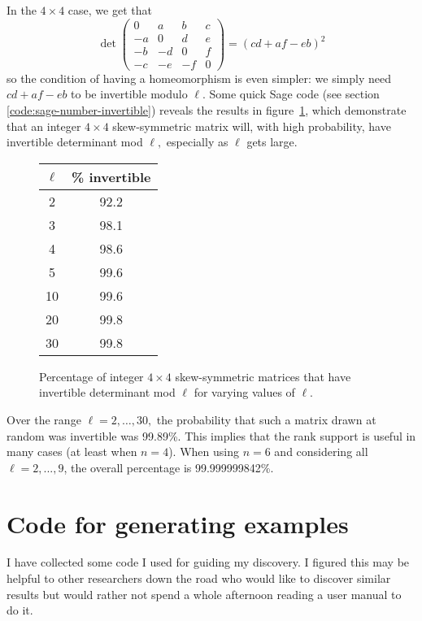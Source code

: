 \documentclass [11pt, proquest] {uwthesis}[2020/02/24]
\begin{document}
{    In the $4\times 4$ case, we get that
    \[\det\begin{pmatrix}
        0 & a & b & c\\
        -a & 0 & d & e\\
        -b & -d & 0 & f\\
        -c & -e & -f & 0
    \end{pmatrix}=(cd+af-eb)^2\]
    so the condition of having a homeomorphism is even simpler: we simply need $cd+af-eb$ to be invertible modulo $\ell.$ Some quick Sage code (see section \ref{code:sage-number-invertible}) reveals the results in figure~\ref{fig:invertible-table}, which demonstrate that an integer $4\times 4$ skew-symmetric matrix will, with high probability, have invertible determinant mod $\ell,$ especially as $\ell$ gets large. 
    \begin{figure}
        \centering
        \begin{tabular}{c|c}
            $\ell$ & \% invertible \\\hline
            2 & 92.2\\
            3 & 98.1\\
            4 & 98.6\\
            5 & 99.6\\
            10 & 99.6\\
            20 & 99.8\\
            30 & 99.8
        \end{tabular}
        \caption{Percentage of integer $4\times 4$ skew-symmetric matrices that have invertible determinant mod $\ell$ for varying values of $\ell$.}
        \label{fig:invertible-table}
    \end{figure}
    Over the range $\ell=2,\dots,30,$ the probability that such a matrix drawn at random was invertible was 99.89\%. This implies that the rank support is useful in many cases (at least when $n=4$). When using $n=6$ and considering all $\ell=2,...,9$, the overall percentage is 99.999999842\%.
}
\printendnotes

%
%
\nocite{*}   %


%
%
\appendix
\raggedbottom\sloppy
 
 
\chapter{Code for generating examples}
I have collected some code I used for guiding my discovery. I figured this may be helpful to other researchers down the road who would like to discover similar results but would rather not spend a whole afternoon reading a user manual to do it.
\end{document}
